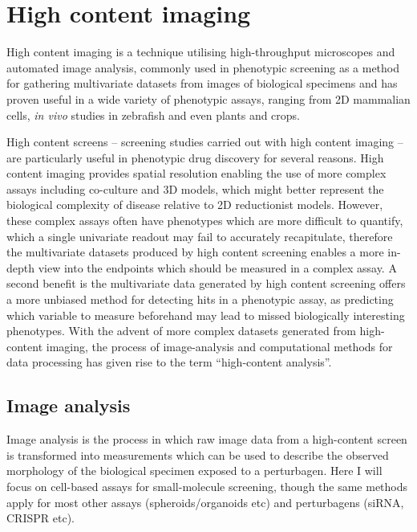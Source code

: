 \documentclass[a4paper,11pt,twoside,openright]{scrbook}
\begin{document}



\section{High content imaging}
High content imaging is a technique utilising high-throughput microscopes and automated image analysis, commonly used in phenotypic screening as a method for gathering multivariate datasets from images of biological specimens and has proven useful in a wide variety of phenotypic assays, ranging from 2D mammalian cells, \cite{Leggett2016,Tabata2015} \textit{in vivo} studies in zebrafish \cite{GeoffreyBurns2005} and even plants and crops. \cite{Chen2014}

High content screens -- screening studies carried out with high content imaging -- are particularly useful in phenotypic drug discovery for several reasons.
High content imaging provides spatial resolution enabling the use of more complex assays including co-culture and 3D models, which might better represent the biological complexity of disease relative to 2D reductionist models.
However, these complex assays often have phenotypes which are more difficult to quantify, which a single univariate readout may fail to accurately recapitulate,
therefore the multivariate datasets produced by high content screening enables a more in-depth view into the endpoints which should be measured in a complex assay.
A second benefit is the multivariate data generated by high content screening offers a more unbiased method for detecting hits in a phenotypic assay, as predicting which variable to measure beforehand may lead to missed biologically interesting phenotypes.
With the advent of more complex datasets generated from high-content imaging, the process of image-analysis and computational methods for data processing has given rise to the term ``high-content analysis''.


\subsection{Image analysis}
Image analysis is the process in which raw image data from a high-content screen is transformed into measurements which can be used to describe the observed morphology of the biological specimen exposed to a perturbagen.
Here I will focus on cell-based assays for small-molecule screening, though the same methods apply for most other assays (spheroids/organoids etc) and perturbagens (siRNA, CRISPR etc).
\end{document}

